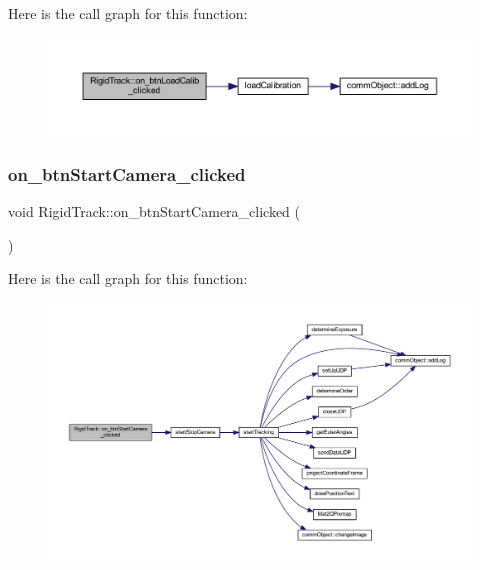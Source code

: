 Here is the call graph for this function\+:
\nopagebreak
\begin{figure}[H]
\begin{center}
\leavevmode
\includegraphics[width=350pt]{class_rigid_track_a2224d3f6d923a1c7bad356f49d7a4124_cgraph}
\end{center}
\end{figure}
\mbox{\label{class_rigid_track_a2f226856e28868c8bb1854fa16531f60}} 
\subsubsection{\texorpdfstring{on\+\_\+btn\+Start\+Camera\+\_\+clicked}{on\_btnStartCamera\_clicked}}
{\footnotesize\ttfamily void Rigid\+Track\+::on\+\_\+btn\+Start\+Camera\+\_\+clicked (\begin{DoxyParamCaption}{ }\end{DoxyParamCaption})\hspace{0.3cm}{\ttfamily [slot]}}

Here is the call graph for this function\+:
\nopagebreak
\begin{figure}[H]
\begin{center}
\leavevmode
\includegraphics[width=350pt]{class_rigid_track_a2f226856e28868c8bb1854fa16531f60_cgraph}
\end{center}
\end{figure}
\mbox{\label{class_rigid_track_afb1a4edcacc818db4ec6bb017dd07e0f}} 
